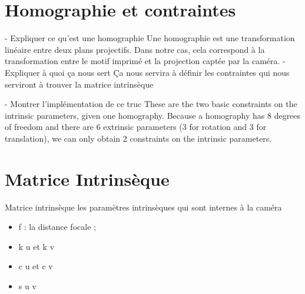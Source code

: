 \documentclass{article}
\begin{document}
\clearpage


\section{Homographie et contraintes}

- Expliquer ce qu'est une homographie
Une homographie est une transformation linéaire entre deux plans projectifs.
Dans notre cas, cela correspond à la transformation entre le motif imprimé et la projection captée par la caméra.
- Expliquer à quoi ça nous sert
Ça nous servira à définir les contraintes qui nous serviront à trouver la matrice intrinsèque

- Montrer l'implémentation de ce truc
These are the two basic constraints on the intrinsic parameters, given one homography.  Because a
homography has 8 degrees of freedom and there are 6 extrinsic parameters (3 for rotation and 3 for
translation), we can only obtain 2 constraints on the intrinsic parameters.




\section{Matrice Intrinsèque}

Matrice intrinsèque
les paramètres intrinsèques qui sont internes à la caméra
\begin{itemize}
\item f : la distance focale ;
\item k u  et  k v %
\item c u  et  c v %
\item s u v %
\end{itemize}
\end{document}
